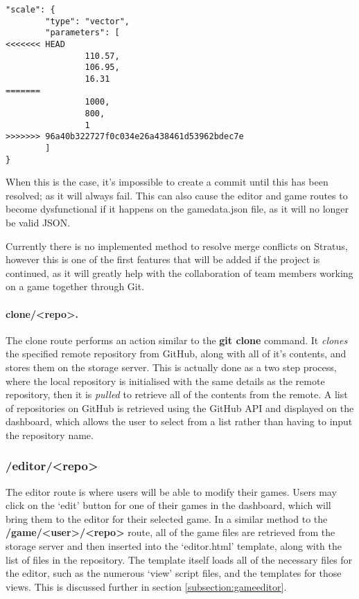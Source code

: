 	\begin{lstlisting}
"scale": {
        "type": "vector",
        "parameters": [
<<<<<<< HEAD
                110.57,
                106.95,
                16.31
=======
                1000,
                800,
                1
>>>>>>> 96a40b322727f0c034e26a438461d53962bdec7e
        ]
}\end{lstlisting}

	When this is the case, it's impossible to create a commit until this has been resolved; as it will always fail. This can also cause the editor and game routes to become dysfunctional if it happens on the gamedata.json file, as it will no longer be valid JSON.

	Currently there is no implemented method to resolve merge conflicts on Stratus, however this is one of the first features that will be added if the project is continued, as it will greatly help with the collaboration of team members working on a game together through Git.

	\paragraph{clone/<repo>.}
	The clone route performs an action similar to the \textbf{git clone} command. It \emph{clones} the specified remote repository from GitHub, along with all of it's contents, and stores them on the storage server. This is actually done as a two step process, where the local repository is initialised with the same details as the remote repository, then it is \emph{pulled} to retrieve all of the contents from the remote. A list of repositories on GitHub is retrieved using the GitHub API and displayed on the dashboard, which allows the user to select from a list rather than having to input the repository name.
	
	\subsubsection{/editor/<repo>}
	The editor route is where users will be able to modify their games. Users may click on the `edit' button for one of their games in the dashboard, which will bring them to the editor for their selected game. In a similar method to the \textbf{/game/<user>/<repo>} route, all of the game files are retrieved from the storage server and then inserted into the `editor.html' template, along with the list of files in the repository. The template itself loads all of the necessary files for the editor, such as the numerous `view' script files, and the templates for those views. This is discussed further in section \ref{subsection:gameeditor}.

